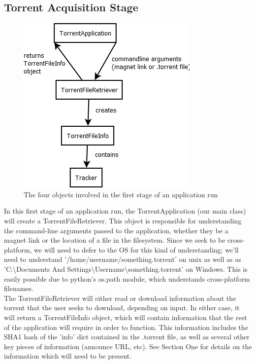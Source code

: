 \documentclass[letter]{scrartcl}
\begin{document}
\subsection{Torrent Acquisition Stage}

\begin{figure}[h]
\centering
\includegraphics[scale=.5]{stepOne.png}
\caption{The four objects involved in the first stage of an application run}
\end{figure}

In this first stage of an application run, the TorrentApplication (our main class) will create a TorrentFileRetriever.  This object is responsible for understanding the command-line arguments passed to the application, whether they be a magnet link or the location of a file in the filesystem.  Since we seek to be cross-platform, we will need to defer to the OS for this kind of understanding; we'll need to understand '/home/username/something.torrent' on unix as well as as 'C:\textbackslash Documents And Settings\textbackslash Username\textbackslash something.torrent' on Windows.  This is easily possible due to python's os.path module, which understands cross-platform filenames.\\

The TorrentFileRetriever will either read or download information about the torrent that the user seeks to download, depending on input.  In either case, it will return a TorrentFileInfo object, which will contain information that the rest of the application will require in order to function.  This information includes the SHA1 hash of the 'info' dict contained in the .torrent file, as well as several other key pieces of information (announce URL, etc).  See Section One for details on the information which will need to be present.\\
\end{document}
